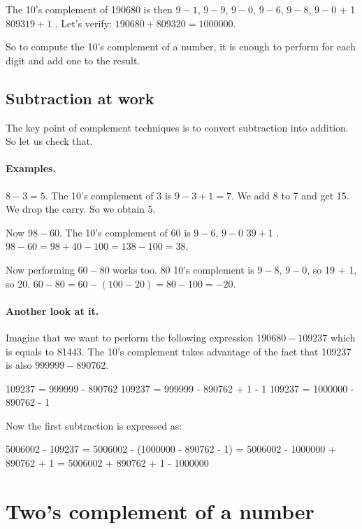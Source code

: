 \documentclass[a4paper,10pt,twoside]{book}
\begin{document}
The 10's complement of 190680 is then $9-1$, $9-9$, $9-0$, $9-6$, $9-8$, $9-0$ + 1 \ie $809319 + 1$ . Let's verify: $190680 + 809320 = 1000000$.
 
So to compute the 10's complement of a number, it is enough to perform  for each digit and add one to the result.


\subsection{Subtraction at work}
The key point of complement techniques is to convert subtraction into addition. So let us check that.

\paragraph{Examples.}
$8 - 3 = 5$. The 10's complement of 3 is $9 - 3 + 1 = 7$. We add 8 to 7 and get 15. 
We drop the carry. So we obtain 5.


Now $98-60$. The 10's complement of 60 is $9-6$, $9-0$ \ie $39 + 1$ . 
$98-60 = 98 + 40 - 100 = 138 - 100 = 38$.


Now performing $60-80$ works too. 80 10's complement is $9-8$, $9-0$, so 19 + 1, so 20.
$60 - 80 = 60 - (100 - 20) = 80 - 100 = -20$.


\paragraph{Another look at it.} 
Imagine that we want to perform the following expression $190680 - 109237$ which is equals to 81443.
The 10's complement takes advantage of the fact that 109237 is also $999999 - 890762$.

\begin{code}{}
109237 = 999999 - 890762
109237 = 999999 - 890762 + 1 - 1
109237 = 1000000 - 890762 - 1
\end{code}

Now the first subtraction is expressed as:

\begin{code}{}
5006002 - 109237 = 5006002 - (1000000 - 890762 - 1)
= 5006002 - 1000000 + 890762 + 1
= 5006002  + 890762 + 1 - 1000000
\end{code}


\section{Two's complement of a number}
\end{document}

